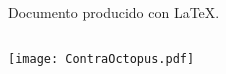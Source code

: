\documentclass[11pt,a4paper,leqno,titlepage,twoside]{book}
\begin{document}
\newpage

\cleardoublepage

\pagestyle{empty}
\vspace*{\fill}
\begin{center}
    \sf Documento producido con \LaTeX.
\end{center}
\vspace*{\fill}

\cleardoublepage

$ $
\newpage




\texttt{[image: ContraOctopus.pdf]}
\end{document}
